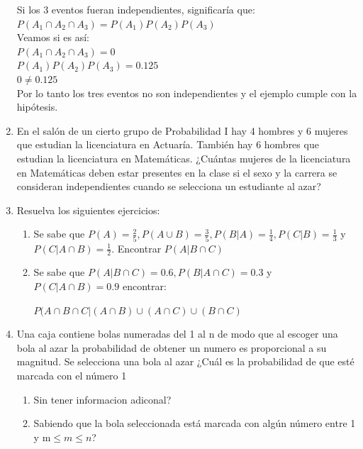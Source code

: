 \documentclass[12pt,a4paper]{report}
\begin{document}
\begin{enumerate}
{  Si los 3 eventos fueran independientes, significaría que: \\$P(A_{1} \cap A_{2} \cap A_{3}) = P(A_{1})P(A_{2})P(A_{3})$\\
  Veamos si es así:\\
  $P(A_{1} \cap A_{2} \cap A_{3}) = 0$\\
  $P(A_{1})P(A_{2})P(A_{3}) = 0.125$\\
  $ 0  \neq 0.125$ \\
  Por lo tanto los tres eventos no son independientes y el ejemplo cumple con la hipótesis.\\
	}

   \item {En el salón de un cierto grupo de Probabilidad I hay 4 hombres y 6 mujeres que estudian la licenciatura en Actuaría. También hay 6 hombres que estudian la licenciatura en Matemáticas. ¿Cuántas mujeres de la licenciatura en Matemáticas deben estar presentes en la clase si el sexo y la carrera se consideran independientes cuando se selecciona un estudiante al azar?	
	}

  \item{
 Resuelva los siguientes ejercicios:\\
 \begin{enumerate}[label=\alph*) ]
 \item{Se sabe que $P(A)= \frac{2}{5},P(A\cup B)=\frac{3}{5},P(B|A)=\frac{1}{4},P(C|B)=\frac{1}{3}$ y $P(C|A\cap B)=\frac{1}{2}$. Encontrar $P(A|B\cap C)$}\\
 \item{Se sabe que $P(A|B\cap C)=0.6, P(B|A\cap C)=0.3$ y $P(C|A\cap B)=0.9$ encontrar: \\ 
 \begin{center}
 $P(A\cap B\cap C| (A\cap B) \cup (A\cap C) \cup (B\cap C)$
 \end{center} }
 \end{enumerate}
  }


  \item{
 Una caja contiene bolas numeradas del 1 al n de modo que al escoger una bola al azar la probabilidad de obtener un numero es proporcional a su magnitud. Se selecciona una bola al azar ¿Cuál es la probabilidad de que esté marcada con el número 1\\
 \begin{enumerate}[label= \alph*) ]
 \item{Sin tener informacion adiconal?}\\
 \item{Sabiendo que la bola seleccionada está marcada con algún número entre 1 y m$\leq m \leq n$?}
 \end{enumerate}
  }


\end{enumerate}
\end{document}
